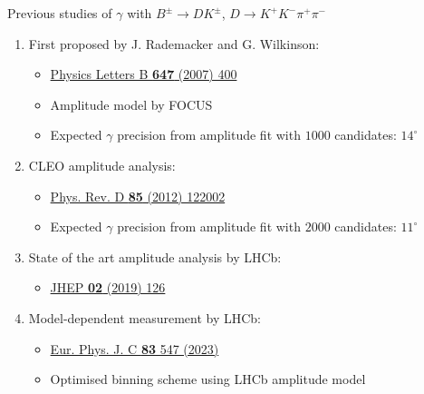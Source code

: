 \documentclass[xcolor={dvipsnames}]{beamer}
\begin{document}
\begin{frame}{Previous studies of $\gamma$ with $B^\pm\to DK^\pm$, $D\to K^+K^-\pi^+\pi^-$}
  \vspace{0.0cm}
  \begin{enumerate}
    \setlength\itemsep{1.2em}
    \item{First proposed by J. Rademacker and G. Wilkinson:}
    \begin{itemize}
      \item{\href{https://arxiv.org/abs/hep-ph/0611272}{Physics Letters B \textbf{647} (2007) 400}}
      \item{Amplitude model by FOCUS}
      \item{Expected $\gamma$ precision from amplitude fit with $1000$ candidates: $14^\circ$}
    \end{itemize}
    \item{CLEO amplitude analysis:}
    \begin{itemize}
      \item{\href{https://arxiv.org/abs/1201.5716}{Phys. Rev. D \textbf{85} (2012) 122002}}
      \item{Expected $\gamma$ precision from amplitude fit with $2000$ candidates: $11^\circ$}
    \end{itemize}
    \item{State of the art amplitude analysis by LHCb:}
    \begin{itemize}
      \item{\href{https://arxiv.org/abs/1811.08304}{JHEP \textbf{02} (2019) 126}}
    \end{itemize}
    \item{Model-dependent measurement by LHCb:}
    \begin{itemize}
      \item{\href{https://arxiv.org/abs/2301.10328}{Eur. Phys. J. C \textbf{83} 547 (2023)}}
      \item{Optimised binning scheme using LHCb amplitude model}
    \end{itemize}
  \end{enumerate}
\end{frame}
\end{document}
